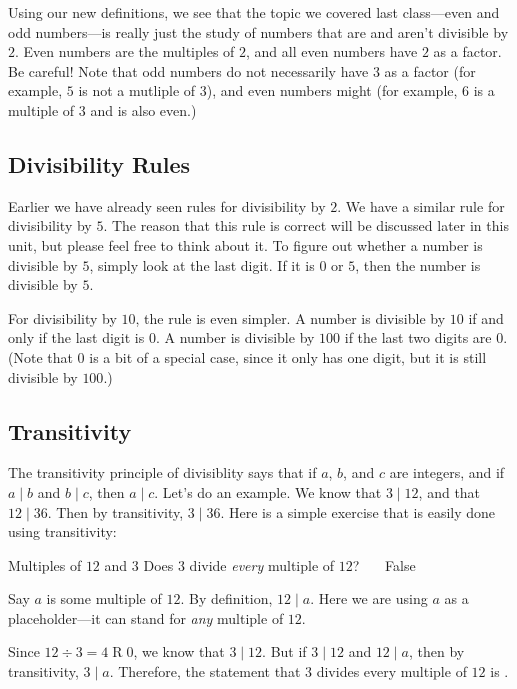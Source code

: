 \documentclass[a4paper,10pt]{report}
\begin{document}
Using our new definitions, we see that the topic we covered last class---even
and odd numbers---is really just the study of numbers that are and aren't
divisible by $2$. Even numbers are the multiples of $2$, and all even numbers
have $2$ as a factor. Be careful! Note that odd numbers do not necessarily have
$3$ as a factor (for example, $5$ is not a mutliple of $3$), and even numbers
might (for example, $6$ is a multiple of $3$ and is also even.)

\subsection{Divisibility Rules}

Earlier we have already seen rules for divisibility by $2$. We have a similar
rule for divisibility by $5$. The reason that this rule is correct will be
discussed later in this unit, but please feel free to think about it. To figure
out whether a number is divisible by $5$, simply look at the last digit. If it
is $0$ or $5$, then the number is divisible by $5$.

For divisibility by $10$, the rule is even simpler. A number is divisible by
$10$ if and only if the last digit is $0$. A number is divisible by $100$ if the
last two digits are $0$. (Note that $0$ is a bit of a special case, since it
only has one digit, but it is still divisible by $100$.)

\subsection{Transitivity}

The \gls{transitivity} principle of divisiblity says that if $a$, $b$, and $c$
are integers, and if $a \mid b$ and $b \mid c$, then $a \mid c$. Let's do an
example. We know that $3 \mid 12$, and that $12 \mid 36$. Then by transitivity,
$3 \mid 36$. Here is a simple exercise that is easily done using transitivity:

\begin{problem}{Multiples of $12$ and $3$}
 Does $3$ divide \emph{every} multiple of $12$? \hfill {}~~~False

 \begin{solution}
  Say $a$ is some multiple of $12$. By definition, $12 \mid a$. Here we are
  using $a$ as a placeholder---it can stand for \emph{any} multiple of $12$.

  Since $12 \div 3 = 4 \operatorname{R} 0$, we know that $3 \mid 12$. But if $3
  \mid 12$ and $12 \mid a$, then by transitivity, $3 \mid a$. Therefore, the
  statement that $3$ divides every multiple of $12$ is .
 \end{solution}
\end{problem}
\end{document}

